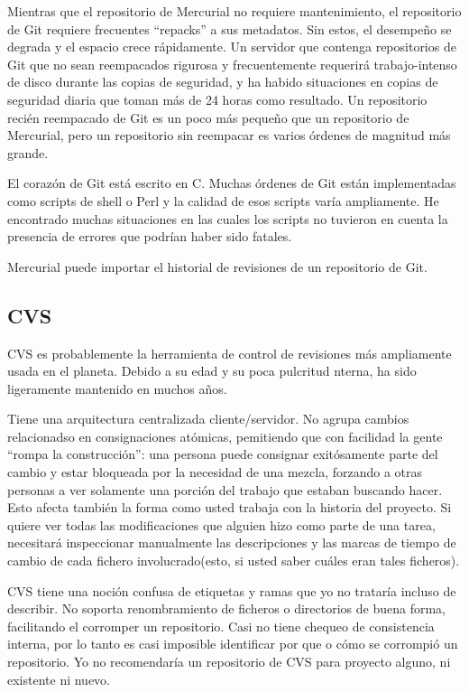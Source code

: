 Mientras que el repositorio de Mercurial no requiere mantenimiento, el
repositorio de Git requiere frecuentes ``repacks'' a sus metadatos.
Sin estos, el desempeño se degrada y el espacio crece rápidamente. Un
servidor que contenga repositorios de Git que no sean reempacados
rigurosa y frecuentemente requerirá trabajo-intenso de disco durante
las copias de seguridad, y ha habido situaciones en copias de
seguridad diaria que toman más de 24 horas como resultado. Un
repositorio recién reempacado de Git es un poco más pequeño que un
repositorio de Mercurial, pero un repositorio sin reempacar es varios
órdenes de magnitud más grande.

El corazón de Git está escrito en C.  Muchas órdenes de Git están
implementadas como scripts de shell o Perl y la calidad de esos
scripts varía ampliamente. He encontrado muchas situaciones en las
cuales los scripts no tuvieron en cuenta la presencia de errores que
podrían haber sido fatales.

Mercurial puede importar el historial de revisiones de un repositorio
de Git.

\subsection{CVS}

CVS es probablemente la herramienta de control de revisiones más
ampliamente usada en el planeta.  Debido a su edad y su poca pulcritud
nterna, ha sido ligeramente mantenido en muchos años.

Tiene una arquitectura centralizada cliente/servidor. No agrupa
cambios relacionadso en consignaciones atómicas, pemitiendo que con
facilidad la gente ``rompa la construcción'': una persona puede
consignar exitósamente parte del cambio y estar bloqueada por la
necesidad de una mezcla, forzando a otras personas a ver solamente una
porción del trabajo que estaban buscando hacer.  Esto afecta también
la forma como usted trabaja con la historia del proyecto. Si quiere
ver todas las modificaciones que alguien hizo como parte de una tarea,
necesitará inspeccionar manualmente las descripciones y las marcas de
tiempo de cambio de cada fichero involucrado(esto, si usted saber
cuáles eran tales ficheros).

CVS tiene una noción confusa de etiquetas y ramas que yo no trataría
incluso de describir.  No soporta renombramiento de ficheros o
directorios de buena forma, facilitando el corromper un
repositorio. Casi no tiene chequeo de consistencia interna, por lo
tanto es casi imposible identificar por que o cómo se corrompió un
repositorio. Yo no recomendaría un repositorio de CVS para proyecto
alguno, ni existente ni nuevo.

